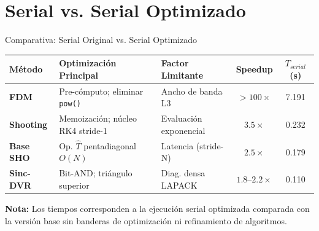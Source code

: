 \documentclass[aspectratio=169,10pt]{beamer}
\begin{document}
\section{Serial vs. Serial Optimizado}

\begin{frame}{Comparativa: Serial Original vs. Serial Optimizado}

\begin{center}
\small %
\begin{tabular}{lp{3.2cm}p{3.2cm}cc}
\toprule
\textbf{Método} & \textbf{Optimización Principal} & \textbf{Factor Limitante} & \textbf{Speedup} & \textbf{$T_{serial}$ (s)}\\
\midrule
\textbf{FDM} & Pre-cómputo; eliminar \texttt{pow()} & Ancho de banda L3 & $> 100\times$ & 7.191 \\
\textbf{Shooting} & Memoización; núcleo RK4 stride-1 & Evaluación exponencial & $3.5\times$ & 0.232 \\
\textbf{Base SHO} & Op. $\hat{T}$ pentadiagonal $O(N)$ & Latencia (stride-N) & $2.5\times$ & 0.179 \\
\textbf{Sinc-DVR} & Bit-AND; triángulo superior & Diag. densa LAPACK & $1.8$--$2.2\times$ & 0.110 \\
\bottomrule
\end{tabular}
\end{center}

\vspace{0.4cm}
\footnotesize
\textbf{Nota:} Los tiempos corresponden a la ejecución serial optimizada comparada con la versión base sin banderas de optimización ni refinamiento de algoritmos.

\end{frame}
\end{document}
